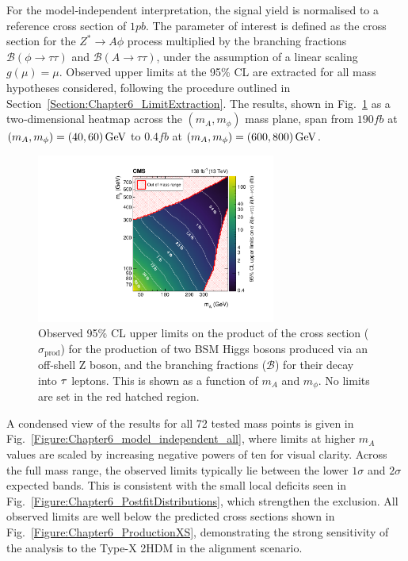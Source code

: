 For the model‑independent interpretation, the signal yield is normalised to a reference cross section of $1\unit{pb}$. The parameter of interest is defined as the cross section for the $Z^* \to A\phi$ process multiplied by the branching fractions $\mathcal{B}(\phi \to \tau\tau)$ and $\mathcal{B}(A \to \tau\tau)$, under the assumption of a linear scaling $g(\mu) = \mu$. Observed upper limits at the 95\% CL are extracted for all mass hypotheses considered, following the procedure outlined in Section~\ref{Section:Chapter6_LimitExtraction}. The results, shown in Fig.~\ref{Figure:Chapter6_model_independent} as a two‑dimensional heatmap across the $(m_A, m_\phi)$ mass plane, span from $190\unit{fb}$ at $(m_A, m_\phi) = (40, 60)\,\text{Ge\hspace{-.08em}V}$ to $0.4\unit{fb}$ at $(m_A, m_\phi) = (600, 800)\,\text{Ge\hspace{-.08em}V}$.

\begin{figure}[!htbp]
    \centering        
    \includegraphics[width=0.7\textwidth]{Figures/Chapter6/mi_2d.pdf}
    \caption[Observed 95\% CL upper limits on $\sigma_\text{prod} \times \mathcal{B}(\phi\to\tau\tau)\times\mathcal{B}(A\to\tau\tau)$]{Observed 95\% CL upper limits on the product of the cross section ($\sigma_\text{prod}$) for the production of two BSM Higgs bosons produced via an off-shell Z boson, and the branching fractions ($\mathcal{B}$) for their decay into $\tau$ leptons. This is shown as a function of $m_A$ and $m_\phi$. No limits are set in the red hatched region.}
    \label{Figure:Chapter6_model_independent}
\end{figure}

A condensed view of the results for all 72 tested mass points is given in Fig.~\ref{Figure:Chapter6_model_independent_all}, where limits at higher $m_A$ values are scaled by increasing negative powers of ten for visual clarity.  Across the full mass range, the observed limits typically lie between the lower $1\sigma$ and $2\sigma$ expected bands. This is consistent with the small local deficits seen in Fig.~\ref{Figure:Chapter6_PostfitDistributions}, which strengthen the exclusion. All observed limits are well below the predicted cross sections shown in Fig.~\ref{Figure:Chapter6_ProductionXS}, demonstrating the strong sensitivity of the analysis to the Type-X 2HDM in the alignment scenario.

